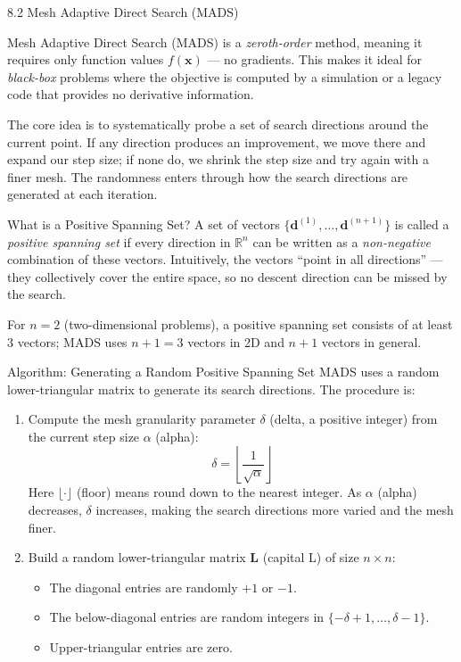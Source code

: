 \documentclass[aspectratio=169,10pt]{beamer}
\begin{document}
\begin{frame}[allowframebreaks]{8.2 Mesh Adaptive Direct Search (MADS)}

Mesh Adaptive Direct Search (MADS) is a \emph{zeroth-order} method, meaning it requires only function values $f(\mathbf{x})$ --- no gradients.
This makes it ideal for \emph{black-box} problems where the objective is computed by a simulation or a legacy code that provides no derivative information.

The core idea is to systematically probe a set of search directions around the current point.
If any direction produces an improvement, we move there and expand our step size; if none do, we shrink the step size and try again with a finer mesh.
The randomness enters through how the search directions are generated at each iteration.

\begin{block}{What is a Positive Spanning Set?}
A set of vectors $\{\mathbf{d}^{(1)}, \ldots, \mathbf{d}^{(n+1)}\}$ is called a \emph{positive spanning set} if every direction in $\mathbb{R}^n$ can be written as a \emph{non-negative} combination of these vectors.
Intuitively, the vectors ``point in all directions'' --- they collectively cover the entire space, so no descent direction can be missed by the search.

For $n = 2$ (two-dimensional problems), a positive spanning set consists of at least 3 vectors; MADS uses $n+1 = 3$ vectors in 2D and $n+1$ vectors in general.
\end{block}

\begin{block}{Algorithm: Generating a Random Positive Spanning Set}
MADS uses a random lower-triangular matrix to generate its search directions. The procedure is:
\begin{enumerate}
  \item Compute the mesh granularity parameter $\delta$ (delta, a positive integer) from the current step size $\alpha$ (alpha):
    \[
      \delta = \left\lfloor \frac{1}{\sqrt{\alpha}} \right\rfloor
    \]
    Here $\lfloor \cdot \rfloor$ (floor) means round down to the nearest integer. As $\alpha$ (alpha) decreases, $\delta$ increases, making the search directions more varied and the mesh finer.

  \item Build a random lower-triangular matrix $\mathbf{L}$ (capital L) of size $n \times n$:
    \begin{itemize}
      \item The diagonal entries are randomly $+1$ or $-1$.
      \item The below-diagonal entries are random integers in $\{-\delta+1, \ldots, \delta-1\}$.
      \item Upper-triangular entries are zero.
    \end{itemize}


\end{enumerate}
\end{block}
\end{frame}
\end{document}
